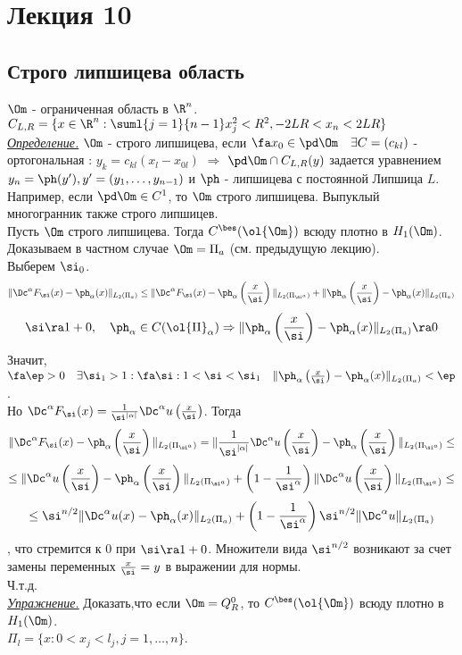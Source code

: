 \documentclass[a4paper,draft]{article}
\begin{document}

\section{Лекция 10}
\subsection{Строго липшицева область}
$\Om$ - ограниченная область в $\R^n$.
$C_{L,R}=\{x\in\R^n: \suml{j=1}{n-1}x_j^2<R^2,
-2LR<x_n<2LR\}$\\
\underline{\textit{Определение.}} $\Om$ - строго липшицева,
если $\fa x_0\in\pd\Om\quad \exists C=(c_{kl})$ -
ортогональная : $y_k= c_{kl}(x_l-x_{0l})$ $\Rightarrow$
$\pd\Om\cap C_{L,R}(y)$ задается уравнением $y_n=\ph
(y'), y'=(y_1,\ldots,y_{n-1})$ и $\ph$ - липшицева с
постоянной Липшица $L$.\\
Например, если $\pd\Om\in C^1$, то $\Om$ строго
липшицева. Выпуклый многогранник также строго липшицев.\\
Пусть $\Om$ строго липшицева. Тогда
$C^{\bes}(\ol{\Om})$ всюду плотно в $H_1(\Om)$.
Доказываем в частном случае $\Om=\Pi_a$ (см. предыдущую
лекцию).\\
Выберем $\si_0$.
$$
\|\Dc^{\alpha}F_{\si}(x)-\ph_{\alpha}(x)\|_{L_2(\Pi_a)}\le
\|\Dc^{\alpha}F_{\si}(x)-\ph_{\alpha}\left(\frac{x}{\si}\right)\|_{L_2(\Pi_{\si^a})}+
\|\ph_{\alpha}\left(\frac{x}{\si}\right)-\ph_{\alpha}(x)\|_{L_2(\Pi_a)}
$$
$$
\si\ra1+0,\quad \ph_{\alpha}\in
C(\ol{\Pi}_{\alpha})\Rightarrow\|\ph_{\alpha}\left(\frac{x}{\si}\right)-\ph_{\alpha}(x)\|_{L_2(\Pi_a)}\ra
0
$$
Значит, $\fa \ep > 0 \quad \exists \si_1 > 1 :
\fa\si : 1<\si<\si_1\quad
\|\ph_{\alpha}\left(\frac{x}{\si}\right)-\ph_{\alpha}(x)\|_{L_2(\Pi_a)}<\ep$.\\
Но $\Dc^{\alpha}F_{\si}(x) = \frac
{1}{\si^{|\alpha|}}\Dc^{\alpha}u\left(\frac{x}{\si}\right)$.
Тогда
$$
\|\Dc^{\alpha}F_{\si}(x)-\ph_{\alpha}\left(\frac{x}{\si}\right)\|_{L_2(\Pi_{\si^a})}=
\|\frac
{1}{\si^{|\alpha|}}\Dc^{\alpha}u\left(\frac{x}{\si}\right)-\ph_{\alpha}\left(\frac{x}{\si}\right)\|_{L_2(\Pi_{\si^a})}\le
$$
$$
\le\|\Dc^{\alpha}u\left(\frac{x}{\si}\right)-\ph_{\alpha}\left(\frac{x}{\si}\right)\|_{L_2(\Pi_{\si^a})}+
\left(1-\frac{1}{\si^{\alpha}}\right)\|\Dc^{\alpha}u\left(\frac{x}{\si}\right)\|_{L_2(\Pi_{\si^a})}\le
$$
$$
\le\si^{n/2}\|\Dc^{\alpha}u(x)-\ph_{\alpha}(x)\|_{L_2(\Pi_a)}+\left(1-\frac{1}{\si^{\alpha}}\right)\si^{n/2}\|\Dc^{\alpha}u\|
_{L_2(\Pi_a)}
$$
, что стремится к 0 при $\si\ra 1+0$. Множители вида
$\si^{n/2}$ возникают за счет замены переменных
$\frac{x}{\si}=y$ в выражении для нормы.\\
Ч.т.д.\\
\underline{\textit{Упражнение.}} Доказать,что если $\Om=Q_R^0$,
то $C^{\bes}(\ol{\Om})$ всюду плотно в $H_1(\Om)$.\\
$\Pi_l=\{x: 0<x_j<l_j, j=1,\ldots,n\}$.
\end{document}
